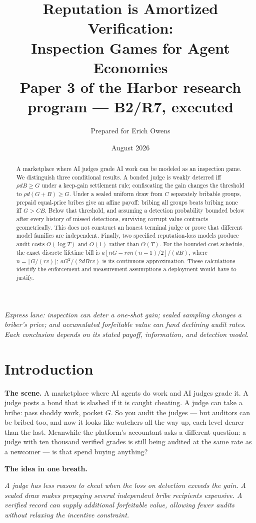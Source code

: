 \documentclass[11pt,a4paper]{article}
\title{\textbf{Reputation is Amortized Verification:}\\[3pt]
\large Inspection Games for Agent Economies\\[3pt]
\normalsize Paper 3 of the Harbor research program --- B2/R7, executed}
\author{Prepared for Erich Owens}
\date{August 2026}
\newcommand{\onebreath}[1]{\begin{center}\emph{#1}\end{center}}
\begin{document}
\maketitle

\begin{abstract}
\noindent A marketplace where AI judges grade AI work can be modeled as an inspection game. We distinguish three conditional results. A bonded judge is weakly deterred iff $\rho dB\ge G$ under a keep-gain settlement rule; confiscating the gain changes the threshold to $\rho d(G+B)\ge G$. Under a sealed uniform draw from $C$ separately bribable groups, prepaid equal-price bribes give an affine payoff: bribing all groups beats bribing none iff $G>CB$. Below that threshold, and assuming a detection probability bounded below after every history of missed detections, surviving corrupt value contracts geometrically. This does not construct an honest terminal judge or prove that different model families are independent. Finally, two specified reputation-loss models produce audit costs $\Theta(\log T)$ and $O(1)$ rather than $\Theta(T)$. For the bounded-cost schedule, the exact discrete lifetime bill is $a[nG-rv n(n-1)/2]/(dB)$, where $n=\lceil G/(rv)\rceil$; $aG^2/(2dBrv)$ is its continuous approximation. These calculations identify the enforcement and measurement assumptions a deployment would have to justify.
\end{abstract}

\noindent\emph{Express lane: inspection can deter a one-shot gain; sealed sampling changes a briber's price; and accumulated forfeitable value can fund declining audit rates. Each conclusion depends on its stated payoff, information, and detection model.}

\section{Introduction}\label{sec:intro}
\textbf{The scene.} A marketplace where AI agents do work and AI judges grade it. A judge posts a bond that is slashed if it is caught cheating. A judge can take a bribe: pass shoddy work, pocket $G$. So you audit the judges --- but auditors can be bribed too, and now it looks like watchers all the way up, each level dearer than the last. Meanwhile the platform's accountant asks a different question: a judge with ten thousand verified grades is still being audited at the same rate as a newcomer --- is that spend buying anything?

\textbf{The idea in one breath.}
\onebreath{A judge has less reason to cheat when the loss on detection exceeds the gain. A sealed draw makes prepaying several independent bribe recipients expensive. A verified record can supply additional forfeitable value, allowing fewer audits without relaxing the incentive constraint.}
\end{document}
